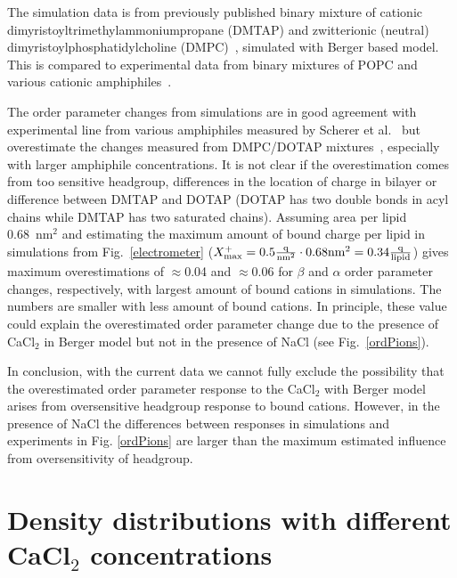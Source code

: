 \documentclass[pre,aps,floatfix,authordate1-4,twocolumn]{revtex4-1}
\begin{document}
The simulation data is from previously published binary mixture of cationic dimyristoyltrimethylammoniumpropane (DMTAP) 
and zwitterionic (neutral) dimyristoylphosphatidylcholine (DMPC)~\cite{miettinen09,DMPC_DMTAP0mol,DMPC_DMTAP6mol,DMPC_DMTAP50mol},
simulated with Berger based model. This is compared to experimental data from binary mixtures of POPC and
various cationic amphiphiles~\cite{scherer89,franzin98}.

The order parameter changes from simulations are in good agreement with experimental line from various amphiphiles
measured by Scherer et al.~\cite{scherer89} but overestimate the changes measured from DMPC/DOTAP mixtures~\cite{franzin98},
especially with larger amphiphile concentrations. It is not clear if the overestimation comes from too sensitive headgroup, 
differences in the location of charge in bilayer or difference between DMTAP and DOTAP (DOTAP has two double bonds in acyl chains
while DMTAP has two saturated chains). Assuming area per lipid 0.68~nm$^2$ and estimating the maximum amount of bound 
charge per lipid in simulations from Fig.~\ref{electrometer} 
($X^+_{\rm max}=0.5\frac{\rm q}{\rm nm^2}\cdot 0.68{\rm nm}^2=0.34\frac{\rm q}{\rm lipid}$) gives maximum
overestimations of $\approx$0.04 and $\approx$0.06 for $\beta$ and $\alpha$ order parameter changes, respectively, with largest amount of bound
cations in simulations. The numbers are smaller with less amount of bound cations. In principle,
these value could explain the overestimated order parameter change due to the presence of CaCl$_2$ in Berger model but not in the presence
of NaCl (see Fig.~\ref{ordPions}).

In conclusion, with the current data we cannot fully exclude the possibility that the overestimated order parameter response to the
CaCl$_2$ with Berger model arises from oversensitive headgroup response to bound cations. However, in the presence of NaCl
the differences between responses in simulations and experiments in Fig. \ref{ordPions} are larger than the maximum estimated 
influence from oversensitivity of headgroup. 

\section{Density distributions with different CaCl$_2$ concentrations}
\end{document}
